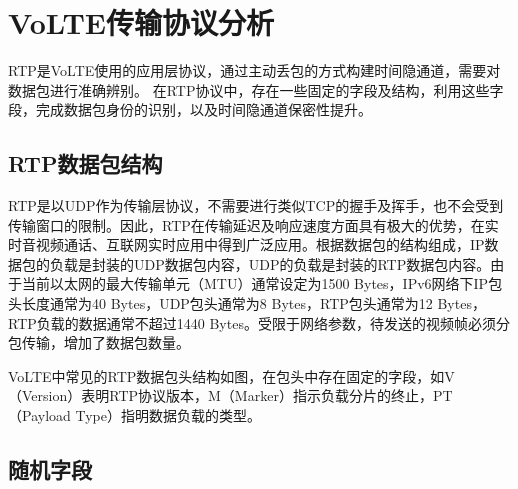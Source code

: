 \section{VoLTE传输协议分析}
\label{chap:backinfo:rtp}

RTP是VoLTE使用的应用层协议，通过主动丢包的方式构建时间隐通道，需要对数据包进行准确辨别。
在RTP协议中，存在一些固定的字段及结构，利用这些字段，完成数据包身份的识别，以及时间隐通道保密性提升。

\subsection{RTP数据包结构}
\label{chap:backinfo:rtp:struct}

RTP是以UDP作为传输层协议，不需要进行类似TCP的握手及挥手，也不会受到传输窗口的限制。因此，RTP在传输延迟及响应速度方面具有极大的优势，在实时音视频通话、互联网实时应用中得到广泛应用。根据数据包的结构组成，IP数据包的负载是封装的UDP数据包内容，UDP的负载是封装的RTP数据包内容。由于当前以太网的最大传输单元（MTU）通常设定为1500 Bytes，IPv6网络下IP包头长度通常为40 Bytes，UDP包头通常为8 Bytes，RTP包头通常为12 Bytes，RTP负载的数据通常不超过1440 Bytes。受限于网络参数，待发送的视频帧必须分包传输，增加了数据包数量。


VoLTE中常见的RTP数据包头结构如图，在包头中存在固定的字段，如V（Version）表明RTP协议版本，M（Marker）指示负载分片的终止，PT（Payload Type）指明数据负载的类型。

\subsection{随机字段}
\label{chap:backinfo:rtp:random}

